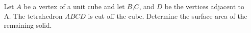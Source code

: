 Let $A$ be a vertex of a unit cube and let $B$,$C$, and $D$ be the vertices adjacent to A. The tetrahedron $ABCD$ is cut off the cube. Determine the surface area of the remaining solid.

